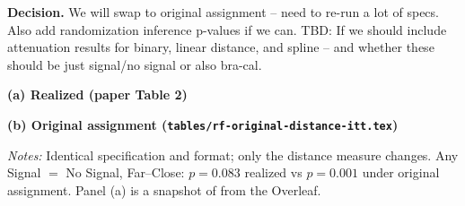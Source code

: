 \documentclass[11pt]{article}
\providecommand{\RefReportsPath}{ref-reports}
\providecommand{\StructuralRobustnessPath}{appendix/structural-robustness}
\providecommand{\RefReportsPath}{.}
\providecommand{\StructuralRobustnessPath}{../appendix/structural-robustness}
\newenvironment{decision}
  {\par\medskip\noindent\begin{minipage}{\linewidth}\color{blue!50!black}\textbf{Decision.} }
  {\end{minipage}\par\medskip}
\begin{document}
\begin{decision}
  We will swap to original assignment -- need to re-run a lot of specs. Also add randomization inference p-values if we can.
  \newline
  TBD: If we should include attenuation results for binary, linear distance, and spline -- and whether these should be just signal/no signal or 
  also bra-cal.
\end{decision}

\begin{table}[htbp]
  \centering
  \small
  \caption{The swap, in the paper's own table format: current principal specification
    (realized Close/Far) vs original-assignment ITT}
  \label{tab:memo-itt-pair}
  \begin{minipage}[t]{0.49\linewidth}
    \centering
    \footnotesize \textbf{(a) Realized (paper Table 2)}\\[0.3em]
  \end{minipage}\hfill
  \begin{minipage}[t]{0.49\linewidth}
    \centering
    \footnotesize \textbf{(b) Original assignment
      (\texttt{tables/rf-original-distance-itt.tex})}\\[0.3em]
  \end{minipage}
  \begin{minipage}{0.96\linewidth}
    \vspace{0.4em}\footnotesize
    \textit{Notes:} Identical specification and format; only the distance measure
    changes. Any Signal $=$ No Signal, Far--Close: $p=0.083$ realized vs $p=0.001$
    under original assignment. Panel (a) is a snapshot of
     from the Overleaf.
  \end{minipage}
\end{table}

\begin{table}[htbp]
  \centering
  \small
  \caption{Reduced-form distance responses and relative attenuation
    (\texttt{sections/reduced-form-distance-multiplier.tex})}
  \label{tab:memo-rf-multiplier}
\end{table}
\end{document}
